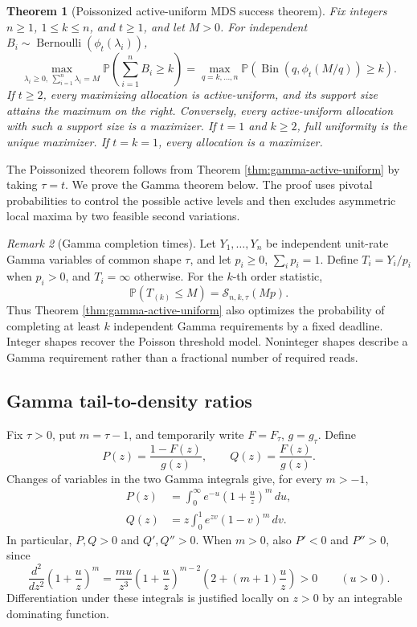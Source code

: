 \documentclass[11pt]{article}
\newtheorem{theorem}{Theorem}[section]
\theoremstyle{definition}
\theoremstyle{remark}
\newtheorem{remark}[theorem]{Remark}
\DeclareMathOperator{\Bernoulli}{Bernoulli}
\DeclareMathOperator{\Bin}{Bin}
\newcommand{\Pbb}{\mathbb P}
\newcommand{\1}{\mathbf 1}
\begin{document}
\begin{theorem}[Poissonized active-uniform MDS success theorem]
\label{thm:full-mds-active-uniform}
Fix integers \(n\ge1\), \(1\le k\le n\), and \(t\ge1\), and let \(M>0\).  For independent
\(B_i\sim\Bernoulli(\phi_t(\lambda_i))\),
\[
  \boxed{
  \max_{\lambda_i\ge0,\ \sum_{i=1}^n\lambda_i=M}
       \Pbb\left(\sum_{i=1}^n B_i\ge k\right)
  =\max_{q=k,\ldots,n}
       \Pbb\left(\Bin(q,\phi_t(M/q))\ge k\right).
  }
\]
If \(t\ge2\), every maximizing allocation is active-uniform, and its support size attains the maximum on the right.  Conversely, every active-uniform allocation with such a support size is a maximizer.  If \(t=1\) and \(k\ge2\), full uniformity is the unique maximizer.  If \(t=k=1\), every allocation is a maximizer.
\end{theorem}

The Poissonized theorem follows from Theorem \ref{thm:gamma-active-uniform} by taking \(\tau=t\).  We prove the Gamma theorem below.  The proof uses pivotal probabilities to control the possible active levels and then excludes asymmetric local maxima by two feasible second variations.

\begin{remark}[Gamma completion times]
Let \(Y_1,\ldots,Y_n\) be independent unit-rate Gamma variables of common shape \(\tau\), and let \(p_i\ge0\), \(\sum_i p_i=1\).  Define \(T_i=Y_i/p_i\) when \(p_i>0\), and \(T_i=\infty\) otherwise.  For the \(k\)-th order statistic,
\[
  \Pbb(T_{(k)}\le M)=\mathcal S_{n,k,\tau}(Mp).
\]
Thus Theorem \ref{thm:gamma-active-uniform} also optimizes the probability of completing at least \(k\) independent Gamma requirements by a fixed deadline.  Integer shapes recover the Poisson threshold model.  Noninteger shapes describe a Gamma requirement rather than a fractional number of required reads.
\end{remark}

\subsection{Gamma tail-to-density ratios}

Fix \(\tau>0\), put \(m=\tau-1\), and temporarily write \(F=F_\tau\), \(g=g_\tau\).  Define
\[
  P(z)=\frac{1-F(z)}{g(z)},
  \qquad Q(z)=\frac{F(z)}{g(z)}.
\]
Changes of variables in the two Gamma integrals give, for every \(m>-1\),
\begin{align}
  P(z)&=\int_0^\infty e^{-u}
                  \left(1+\frac uz\right)^m\,du,
       \label{eq:mds-gamma-P-integral}\\
  Q(z)&=z\int_0^1 e^{zv}(1-v)^m\,dv.
       \label{eq:mds-gamma-Q-integral}
\end{align}
In particular, \(P,Q>0\) and \(Q',Q''>0\).  When \(m>0\), also \(P'<0\) and \(P''>0\), since
\[
  \frac{d^2}{dz^2}\left(1+\frac uz\right)^m
  =\frac{mu}{z^3}\left(1+\frac uz\right)^{m-2}
      \left(2+(m+1)\frac uz\right)>0
  \qquad(u>0).
\]
Differentiation under these integrals is justified locally on \(z>0\) by an integrable dominating function.
\end{document}
